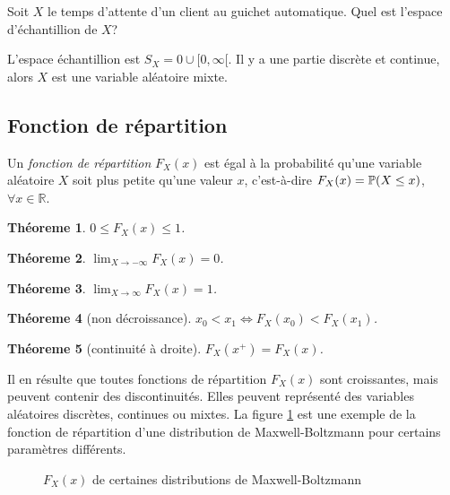 \documentclass[11pt]{article}
\renewcommand\P{%
	\ensuremath{%
		\mathbb{P}%
	}%
}%
\newtheorem{theoreme}{Théoreme}[section]
\begin{document}
\begin{exemple}
	Soit $X$ le temps d'attente d'un client au guichet automatique. Quel est
	l'espace d'échantillion de $X$?

	L'espace échantillion est $S_X={0}\cup [0,\infty[$. Il y a une partie
	discrète et continue, alors $X$ est une variable aléatoire mixte.
\end{exemple}

\subsection{Fonction de répartition}
\begin{definition}
	Un \textit{fonction de répartition} $F_X(x)$ est égal à la probabilité
	qu'une variable aléatoire $X$ soit plus petite qu'une valeur $x$,
	c'est-à-dire $F_X(x)=\P(X\leq x)$, $\forall x\in\mathbb{R}$.
\end{definition}

\begin{theoreme}
	$0\leq F_X(x)\leq 1$.
\end{theoreme}

\begin{theoreme}
	$\displaystyle\lim_{X\rightarrow-\infty}F_X(x)=0$.
\end{theoreme}

\begin{theoreme}
	$\displaystyle\lim_{X\rightarrow \infty}F_X(x)=1$.
\end{theoreme}

\begin{theoreme}[non décroissance]
	$x_0<x_1\Leftrightarrow F_X(x_0)<F_X(x_1)$.
\end{theoreme}

\begin{theoreme}[continuité à droite]
	$F_X(x^+)=F_X(x)$.
\end{theoreme}

Il en résulte que toutes fonctions de répartition $F_X(x)$ sont croissantes,
mais peuvent contenir des discontinuités. Elles peuvent représenté des
variables aléatoires discrètes, continues ou mixtes. La figure
\ref{fig:maxwell} est une exemple de la fonction de répartition d'une
distribution de Maxwell-Boltzmann pour certains paramètres différents.

\begin{figure}[H]
	\centering
	\caption{$F_X(x)$ de certaines distributions de Maxwell-Boltzmann}
	
	\label{fig:maxwell}
\end{figure}
\end{document}
